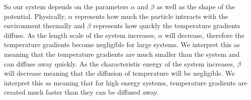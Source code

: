 So our system depends on the parameters $\alpha$ and $\beta$ as well as the shape of the potential. Physically, $\alpha$ represents how much the particle interacts with the environment thermally and $\beta$ represents how quickly the temperature gradients diffuse. As the length scale of the system increases, $\alpha$ will decrease, therefore the temperature gradients become negligible for large systems. We interpret this as meaning that the temperature gradients are much smaller than the system and can diffuse away quickly. As the characteristic energy of the system increases, $\beta$ will decrease meaning that the diffusion of temperature will be negligible. We interpret this as meaning that for high energy systems, temperature gradients are created much faster than they can be diffused away. 



